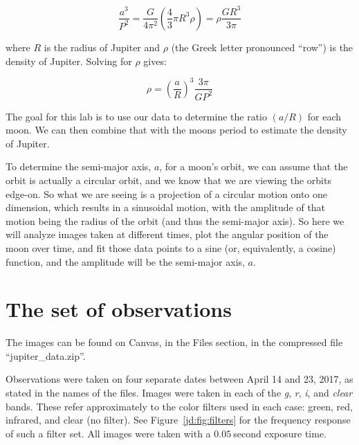 \begin{equation}
\frac{a^3}{P^2} = \frac{G}{4\pi^2}\left(\frac{4}{3}\pi R^3\rho \right) = \rho\frac{G R^3}{3\pi}
\end{equation}

where $R$ is the radius of Jupiter and $\rho$ (the Greek letter pronounced ``row'') is the density of Jupiter. Solving for $\rho$ gives:

\begin{equation}
\rho = \left(\frac{a}{R}\right)^3\frac{3\pi}{G P^2}
\end{equation}

The goal for this lab is to use our data to determine the ratio $(a/R)$ for each moon. We can then combine that with the moons period to estimate the density of Jupiter.

To determine the semi-major axis, $a$, for a moon's orbit, we can assume that the orbit is actually a circular orbit, and we know that we are viewing the orbits edge-on. So what we are seeing is a projection of a circular motion onto one dimension, which results in a sinusoidal motion, with the amplitude of that motion being the radius of the orbit (and thus the semi-major axis). So here we will analyze images taken at different times, plot the angular position of the moon over time, and fit those data points to a sine (or, equivalently, a cosine) function, and the amplitude will be the semi-major axis, $a$.

\section{The set of observations}

The images can be found on Canvas, in the Files section, in the compressed file ``jupiter\_data.zip''.

Observations were taken on four separate dates between April 14 and 23, 2017, as stated in the names of the files. Images were taken in each of the \textit{g}, \textit{r}, \textit{i}, and \textit{clear} bands. These refer approximately to the color filters used in each case: green, red, infrared, and  clear (no filter). See Figure~\ref{jd:fig:filters} for the frequency response of such a filter set. All images were taken with a $0.05\:$second exposure time.

